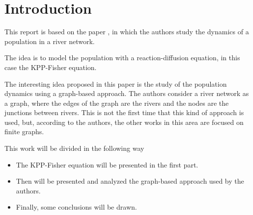 \section{Introduction}
This report is based on the paper \cite{du2019fisherkpp}, in which the authors study the dynamics of a population in a river network.

The idea is to model the population with a reaction-diffusion equation, in this case the KPP-Fisher equation. 

The interesting idea proposed in this paper is the study of the population dynamics using a graph-based approach. The authors consider a river network as a graph, where the edges of the graph are the rivers and the nodes are the junctions between rivers. This is not the first time that this kind of approach is used, but, according to the authors, the other works in this area are focused on finite graphs.

This work will be divided in the following way
\begin{itemize}
    \item The KPP-Fisher equation will be presented in the first part.
    \item Then will be presented and analyzed the graph-based approach used by the authors.
    \item Finally, some conclusions will be drawn.
\end{itemize}

